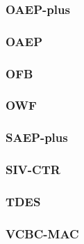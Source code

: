 \begin{frame} \frametitle{OAEP-plus}
\begin{figure}
\begin{center}

\end{center}
\end{figure}
\end{frame}
\begin{frame} \frametitle{OAEP}
\begin{figure}
\begin{center}

\end{center}
\end{figure}
\end{frame}
\begin{frame} \frametitle{OFB}
\begin{figure}
\begin{center}

\end{center}
\end{figure}
\end{frame}
\begin{frame} \frametitle{OWF}
\begin{figure}
\begin{center}

\end{center}
\end{figure}
\end{frame}
\begin{frame} \frametitle{SAEP-plus}
\begin{figure}
\begin{center}

\end{center}
\end{figure}
\end{frame}
\begin{frame} \frametitle{SIV-CTR}
\begin{figure}
\begin{center}

\end{center}
\end{figure}
\end{frame}
\begin{frame} \frametitle{TDES}
\begin{figure}
\begin{center}

\end{center}
\end{figure}
\end{frame}
\begin{frame} \frametitle{VCBC-MAC}
\begin{figure}
\begin{center}

\end{center}
\end{figure}
\end{frame}
